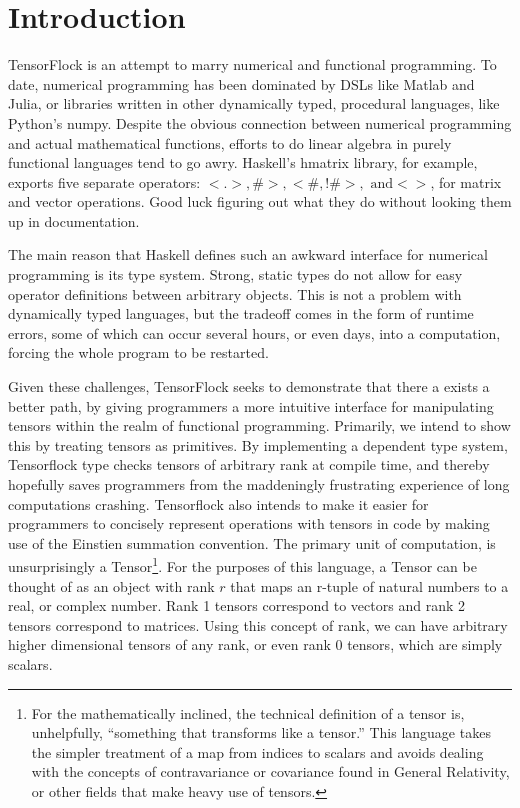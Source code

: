 \documentclass[12pt]{article}
\begin{document}
\maketitle

\section{Introduction}
TensorFlock is an attempt to marry numerical and functional programming.
%
To date, numerical programming has been dominated by DSLs like Matlab and
Julia, or libraries written in other dynamically typed, procedural languages,
like Python's numpy. Despite the obvious connection between numerical
programming and actual mathematical functions, efforts to do linear algebra in
purely functional languages tend to go awry. Haskell's hmatrix library, for
example, exports five separate operators: $<.>, \#>, <\#, !\#>, \text{ and} <>$, for
matrix and vector operations. Good luck figuring out what they do without
looking them up in documentation.

The main reason that Haskell defines such an awkward interface for numerical
programming is its type system. Strong, static types do not allow for easy
operator definitions between arbitrary objects. This is not a problem with
dynamically typed languages, but the tradeoff comes in the form of runtime
errors, some of which can occur several hours, or even days, into
a computation, forcing the whole program to be restarted.

Given these challenges, TensorFlock seeks to demonstrate that there a exists a better path, by giving programmers a more intuitive interface for manipulating tensors within the realm of functional programming.  Primarily, we intend to show this by treating tensors as primitives. By implementing a dependent type system, Tensorflock type checks tensors of arbitrary rank at compile time, and thereby hopefully saves programmers from the maddeningly frustrating experience of long computations crashing.  Tensorflock also intends to make it easier for programmers to concisely represent operations with tensors in code by making use of the Einstien summation convention.
The primary unit of computation, is unsurprisingly a Tensor\footnote{For the
mathematically inclined, the technical definition of a tensor is, unhelpfully,
``something that transforms like a tensor.'' This language takes the simpler
treatment of a map from indices to scalars and avoids dealing with the concepts
of contravariance or covariance found in General Relativity, or other fields
that make heavy use of tensors.}. 
For the purposes
of this language, a Tensor can be thought of as an object with rank $r$ that
maps an r-tuple of natural numbers to a real, or complex number. Rank 1 tensors
correspond to vectors and rank 2 tensors correspond to matrices. Using this
concept of rank, we can have arbitrary higher dimensional tensors of any rank,
or even rank 0 tensors, which are simply scalars.
\end{document}
